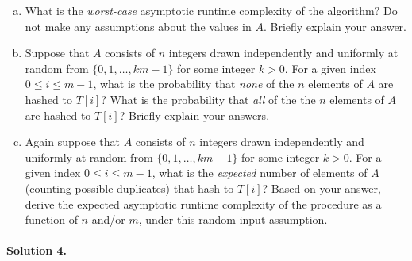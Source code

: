 \documentclass[11pt]{article}
\begin{document}
\begin{enumerate}[(a)]
    \item What is the \textit{worst-case} asymptotic runtime complexity of the
         algorithm? Do not make any assumptions about the
        values in $A$. Briefly explain your answer.
    \item Suppose that $A$ consists of $n$ integers drawn independently and
        uniformly at random from $\{0,1,\dots,km-1\}$ for some integer $k>0$. 
        For a given index $0 \leq i \leq m-1$,  what is the probability that
        \textit{none} of the $n$ elements of $A$ are hashed to $T[i]$? What is
        the probability that \textit{all} of the the $n$ elements of $A$ are
        hashed to $T[i]$? Briefly explain your answers.
    \item Again suppose that $A$ consists of $n$ integers drawn independently 
        and uniformly at random from $\{0,1,\dots,km-1\}$ for some integer 
        $k>0$. For a given index $0 \leq i \leq m-1$, what is the
        \textit{expected} number of elements of $A$ (counting possible
        duplicates) that hash to $T[i]$? Based on your answer, derive the
        expected asymptotic runtime complexity of the 
        procedure as a function of $n$ and/or $m$, under this random input
        assumption.
\end{enumerate}

\paragraph{Solution 4.}
\end{document}
